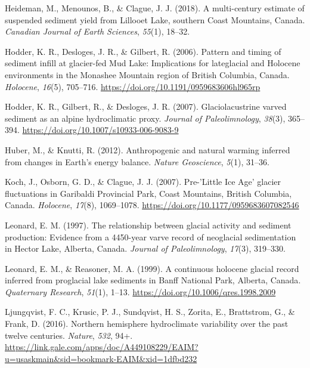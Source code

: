 \documentclass[
  letterpaper,
  DIV=11,
  numbers=noendperiod]{scrartcl}
\newlength{\cslhangindent}
\newenvironment{CSLReferences}[2] %
 {\begin{list}{}{%
  \setlength{\itemindent}{0pt}
  \setlength{\leftmargin}{0pt}
  \setlength{\parsep}{0pt}
  \ifodd #1
   \setlength{\leftmargin}{\cslhangindent}
   \setlength{\itemindent}{-1\cslhangindent}
  \fi
  \setlength{\itemsep}{#2\baselineskip}}}
 {\end{list}}
\begin{document}
\begin{CSLReferences}{1}{0}
Heideman, M., Menounos, B., \& Clague, J. J. (2018). {A multi-century
estimate of suspended sediment yield from Lillooet Lake, southern Coast
Mountains, Canada}. \emph{Canadian Journal of Earth Sciences},
\emph{55}(1), 18--32.

Hodder, K. R., Desloges, J. R., \& Gilbert, R. (2006). {Pattern and
timing of sediment infill at glacier-fed Mud Lake: Implications for
lateglacial and Holocene environments in the Monashee Mountain region of
British Columbia, Canada}. \emph{Holocene}, \emph{16}(5), 705--716.
\url{https://doi.org/10.1191/0959683606hl965rp}

Hodder, K. R., Gilbert, R., \& Desloges, J. R. (2007). {Glaciolacustrine
varved sediment as an alpine hydroclimatic proxy}. \emph{Journal of
Paleolimnology}, \emph{38}(3), 365--394.
\url{https://doi.org/10.1007/s10933-006-9083-9}

Huber, M., \& Knutti, R. (2012). {Anthropogenic and natural warming
inferred from changes in Earth's energy balance}. \emph{Nature
Geoscience}, \emph{5}(1), 31--36.

Koch, J., Osborn, G. D., \& Clague, J. J. (2007). {Pre-'Little Ice Age'
glacier fluctuations in Garibaldi Provincial Park, Coast Mountains,
British Columbia, Canada}. \emph{Holocene}, \emph{17}(8), 1069--1078.
\url{https://doi.org/10.1177/0959683607082546}

Leonard, E. M. (1997). {The relationship between glacial activity and
sediment production: Evidence from a 4450-year varve record of
neoglacial sedimentation in Hector Lake, Alberta, Canada}. \emph{Journal
of Paleolimnology}, \emph{17}(3), 319--330.

Leonard, E. M., \& Reasoner, M. A. (1999). {A continuous holocene
glacial record inferred from proglacial lake sediments in Banff National
Park, Alberta, Canada}. \emph{Quaternary Research}, \emph{51}(1), 1--13.
\url{https://doi.org/10.1006/qres.1998.2009}

Ljungqvist, F. C., Krusic, P. J., Sundqvist, H. S., Zorita, E.,
Brattstrom, G., \& Frank, D. (2016). {Northern hemisphere hydroclimate
variability over the past twelve centuries}. \emph{Nature}, \emph{532},
94+.
\url{https://link.gale.com/apps/doc/A449108229/EAIM?u=usaskmain&sid=bookmark-EAIM&xid=1dfbd232}


\end{CSLReferences}
\end{document}
